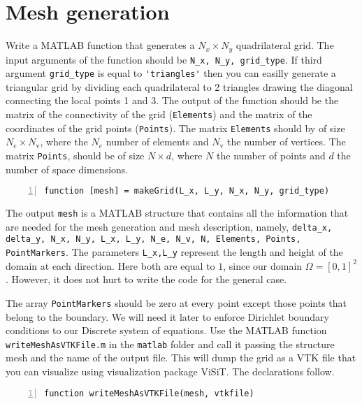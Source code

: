 \documentclass[unicode,11pt,a4paper,oneside,numbers=endperiod,openany]{scrartcl}
\begin{document}
\section{Mesh generation}
Write a \small{MATLAB} function that generates a $N_x \times N_y$ quadrilateral grid.
The input arguments of the function should be \lstinline+N_x, N_y, grid_type+. If third argument \lstinline+grid_type+
is equal to \lstinline+'triangles'+ then you can easilly generate a triangular grid by dividing each quadrilateral
to 2 triangles drawing the diagonal connecting the local points 1 and 3. 
The output of the function should be the matrix of the connectivity of the grid 
(\lstinline+Elements+) and the matrix of the coordinates of the grid points (\lstinline+Points+). 
The matrix \lstinline+Elements+ should by of size $N_e \times N_\text{v}$,
where the $N_e$ number of elements and $N_\text{v}$ the number of vertices. The matrix
\lstinline+Points+, should be of size $N \times d$, where $N$ the number of points and $d$ the number of 
space dimensions.
\begin{lstlisting}[numbers=left, numberstyle=\tiny, stepnumber=1, numbersep=10pt, identifierstyle=\ttfamily\color{Red}\bfseries]
function [mesh] = makeGrid(L_x, L_y, N_x, N_y, grid_type)
\end{lstlisting}
The output \lstinline+mesh+ is a MATLAB structure that contains all the information that are needed for the mesh generation
and mesh description, namely, \lstinline+delta_x, delta_y, N_x, N_y, L_x, L_y, N_e, N_v, N, Elements, Points, PointMarkers+. The parameters \lstinline+L_x,L_y+ represent the length and height of the domain at each direction. Here both are equal to $1$, since our domain $\Omega = [0, 1]^2$. However, it does not hurt to write the code for the general case. 

The array \lstinline+PointMarkers+ should be zero at every point except those points that belong to the boundary. We will 
need it later to enforce Dirichlet boundary conditions to our Discrete system of equations.
Use the MATLAB function \lstinline+writeMeshAsVTKFile.m+ in the \lstinline+matlab+ folder
and call it passing the structure mesh and the name of the output file.
This will dump the grid as a VTK file that you can visualize using visualization package ViSiT. The declarations follow.
\begin{lstlisting}[numbers=left, numberstyle=\tiny, stepnumber=1, numbersep=10pt]
function writeMeshAsVTKFile(mesh, vtkfile)
\end{lstlisting}
\end{document}
